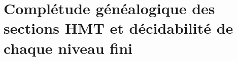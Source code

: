 \chapter{Complétude généalogique des sections HMT et décidabilité de chaque niveau fini}
\label{chap:p3-final:53:completitud_finita}

